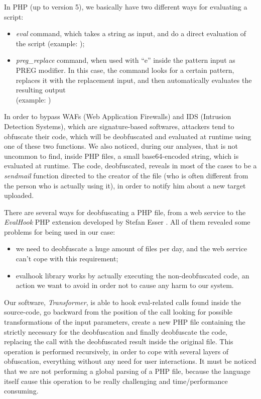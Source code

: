 In PHP (up to version 5), we basically have two different ways for evaluating a script:
\begin{itemize}
\item \emph{eval} command, which takes a string as input, and do a direct evaluation of the script (example: );
\item \emph{preg\_replace} command, when used with ``e'' inside the pattern input as PREG modifier. In this case, the command looks for a certain pattern, replaces it with the replacement input, and then automatically evaluates the resulting output\\(example: ) %
\end{itemize}

In order to bypass WAFs (Web Application Firewalls) and IDS (Intrusion Detection Systems), which are signature-based softwares, attackers tend to obfuscate their code, which will be deobfuscated and evaluated at runtime using one of these two functions.
We also noticed, during our analyses, that is not uncommon to find, inside PHP files, a small base64-encoded string, which is evaluated at runtime. The code, deobfuscated, reveals in most of the cases to be a \emph{sendmail} function directed to the creator of the file (who is often different from the person who is actually using it), in order to notify him about a new target uploaded.

There are several ways for deobfuscating a PHP file, from a web service \cite{webdeobf} to the \emph{EvalHook} PHP extension developed by Stefan Esser \cite{evalhook}. All of them revealed some problems for being used in our case:
\begin{itemize}
\item we need to deobfuscate a huge amount of files per day, and the web service can't cope with this requirement;
\item evalhook library works by actually executing the non-deobfuscated code, an action we want to avoid in order not to cause any harm to our system.
\end{itemize}

Our software, \emph{Transformer}, is able to hook eval-related calls found inside the source-code, go backward from the position of the call looking for possible transformations of the input parameters, create a new PHP file containing the strictly necessary for the deobfuscation and finally deobfuscate the code, replacing the call with the deobfuscated result inside the original file. This operation is performed recursively, in order to cope with several layers of obfuscation, everything without any need for user interactions.
It must be noticed that we are not performing a global parsing of a PHP file, because the language itself cause this operation to be really challenging and time/performance consuming.

